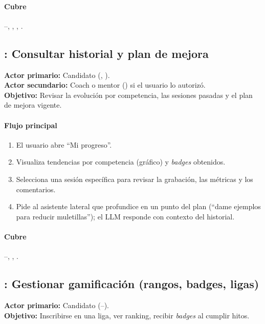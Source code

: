 \paragraph{Cubre} --, , , .

\subsection{: Consultar historial y plan de mejora}
\begin{cajaCriterio}
\textbf{Actor primario:} Candidato (, ). \\
\textbf{Actor secundario:} Coach o mentor () si el usuario lo
autorizó. \\
\textbf{Objetivo:} Revisar la evolución por competencia, las sesiones
pasadas y el plan de mejora vigente.
\end{cajaCriterio}

\paragraph{Flujo principal}
\begin{enumerate}
  \item El usuario abre ``Mi progreso''.
  \item Visualiza tendencias por competencia (gráfico) y \textit{badges}
        obtenidos.
  \item Selecciona una sesión específica para revisar la grabación,
        las métricas y los comentarios.
  \item Pide al asistente lateral que profundice en un punto del plan
        (``dame ejemplos para reducir muletillas''); el LLM responde con
        contexto del historial.
\end{enumerate}

\paragraph{Cubre} --, , .

\subsection{: Gestionar gamificación (rangos, badges, ligas)}
\begin{cajaCriterio}
\textbf{Actor primario:} Candidato (--). \\
\textbf{Objetivo:} Inscribirse en una liga, ver ranking, recibir
\textit{badges} al cumplir hitos.
\end{cajaCriterio}

